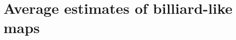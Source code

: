 \documentclass[10pt]{article}
\newtheorem{lemma}[theorem]{Lemma}
\newcommand{\C}{\mathbb{C}}
\newcommand{\T}{\mathbb{T}}
\begin{document}
\section{Average estimates of billiard-like maps}

\end{document}
